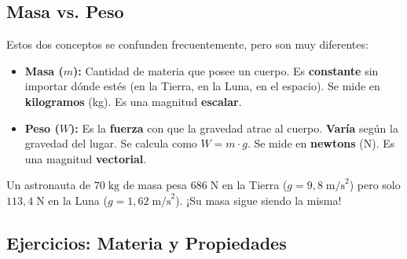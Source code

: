 \documentclass[12pt, a4paper]{article}
\begin{document}
\subsection{Masa vs. Peso}

Estos dos conceptos se confunden frecuentemente, pero son muy diferentes:

\begin{cuadroteoria}
\begin{itemize}[leftmargin=*]
  \item \textbf{Masa ($m$):} Cantidad de materia que posee un cuerpo. Es \textbf{constante} sin importar dónde estés (en la Tierra, en la Luna, en el espacio). Se mide en \textbf{kilogramos} (kg). Es una magnitud \textbf{escalar}.
  
  \item \textbf{Peso ($W$):} Es la \textbf{fuerza} con que la gravedad atrae al cuerpo. \textbf{Varía} según la gravedad del lugar. Se calcula como $W = m \cdot g$. Se mide en \textbf{newtons} (N). Es una magnitud \textbf{vectorial}.
\end{itemize}
\end{cuadroteoria}

Un astronauta de $70\;\text{kg}$ de masa pesa $686\;\text{N}$ en la Tierra ($g = 9{,}8\;\text{m/s}^2$) pero solo $113{,}4\;\text{N}$ en la Luna ($g = 1{,}62\;\text{m/s}^2$). ¡Su masa sigue siendo la misma!


\subsection{Ejercicios: Materia y Propiedades}
\end{document}
